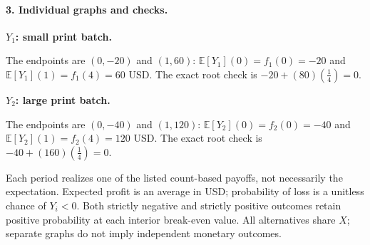 \clearpage\paragraph{3. Individual graphs and checks.}
\textbf{$Y_1$: small print batch.}
\begin{center}\end{center}
The endpoints are $(0,-20)$ and $(1,60)$: $\mathbb E[Y_1](0)=f_1(0)=-20$ and
$\mathbb E[Y_1](1)=f_1(4)=60$ USD.
The exact root check is $-20+(80)(\frac{1}{4})=0$.
\par\medskip
\textbf{$Y_2$: large print batch.}
\begin{center}\end{center}
The endpoints are $(0,-40)$ and $(1,120)$: $\mathbb E[Y_2](0)=f_2(0)=-40$ and
$\mathbb E[Y_2](1)=f_2(4)=120$ USD.
The exact root check is $-40+(160)(\frac{1}{4})=0$.
\par\medskip
Each period realizes one of the listed count-based payoffs, not necessarily the expectation.
Expected profit is an average in USD; probability of loss is a unitless chance of $Y_i<0$.
Both strictly negative and strictly positive outcomes retain positive probability at each interior break-even value.
All alternatives share $X$; separate graphs do not imply independent monetary outcomes.
\clearpage
